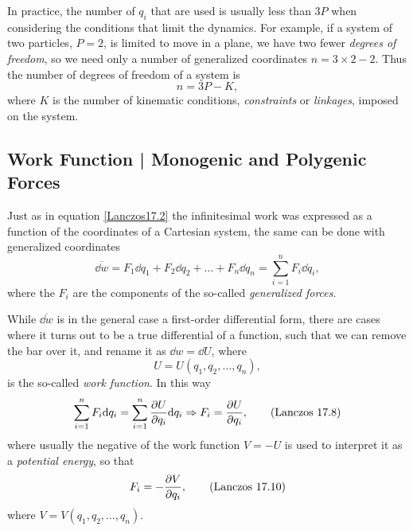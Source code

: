\documentclass[12pt, english, a4paper]{article}
\begin{document}
In practice, the number of \(q_i\) that are used is usually less than \(3P\) when considering the conditions that limit the dynamics.
For example, if a system of two particles, \(P = 2\), is limited to move in a plane, we have two fewer \emph{degrees of freedom}, so we need only a number of generalized coordinates \(n= 3 \times 2 - 2\).
Thus the number of degrees of freedom of a system is 
\begin{equation}
	n = 3 P - K,
\end{equation}
where \(K\) is the number of kinematic conditions, \emph{constraints} or \emph{linkages}, imposed on the system.



\subsection{Work Function | Monogenic and Polygenic Forces}\label{workFunction}
Just as in equation \eqref{Lanczos17.2} the infinitesimal work was expressed as a function of the coordinates of a Cartesian system, the same can be done with generalized coordinates
\begin{equation}\label{Lanczos17.3}
	\overline{\dd w} = F_1 \dd q_1 + F_2 \dd q_2 + \ldots + F_n \dd q_n =  \displaystyle\sum_{i=1}^{n} F_{i} \dd q_i,
	\tag{Lanczos 17.3}
\end{equation}
where the \(F_i\) are the components of the so-called \emph{generalized forces}.

While \(\overline{\dd w}\) is in the general case a first-order differential form, there are cases where it turns out to be a true differential of a function, such that we can remove the bar over it, and rename it as \(\dd w= \dd U\), where
\begin{equation}\label{Lanczos17.6}
	U= U(q_1, q_2, \ldots, q_n),
	\tag{Lanczos 17.6}
\end{equation}
is the so-called \emph{work function}.
In this way
\begin{equation}\label{Lanczos17.8}
	\sum_{i=1}^{n} F_i \dd q_i = \sum_{i=1}^{n} \pdv{U}{q_i} \dd q_i 
	\Rightarrow F_i = \pdv{U}{q_i},
	\tag{Lanczos 17.8}
\end{equation}
where usually the negative of the work function \(V = - U\) is used to interpret it as a \emph{potential energy}, so that 
\begin{align}\label{Lanczos17.10}
	F_i = - \pdv{V}{q_i},
	\tag{Lanczos 17.10}
\end{align}
where \(V= V(q_1, q_2, \ldots, q_n)\).
\end{document}

